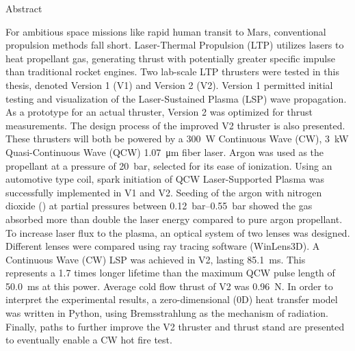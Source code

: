 \begin{plainchp}{Abstract}
    
    For ambitious space missions like rapid human transit to Mars, conventional propulsion methods fall short. Laser-Thermal Propulsion (LTP) utilizes lasers to heat propellant gas, generating thrust with potentially greater specific impulse than traditional rocket engines. Two lab-scale LTP thrusters were tested in this thesis, denoted Version 1 (V1) and Version 2 (V2). Version 1 permitted initial testing and visualization of the Laser-Sustained Plasma (LSP) wave propagation. As a prototype for an actual thruster, Version 2 was optimized for thrust measurements. The design process of the improved V2 thruster is also presented. These thrusters will both be powered by a \qty{300}{W} Continuous Wave (CW), \qty{3}{kW} Quasi-Continuous Wave (QCW) \qty{1.07}{μm} fiber laser. Argon was used as the propellant at a pressure of \qty{20}{bar}, selected for its ease of ionization. Using an automotive type coil, spark initiation of QCW Laser-Supported Plasma was successfully implemented in V1 and V2. Seeding of the argon with nitrogen dioxide () at partial pressures between \qtyrange{.12}{.55}{bar} showed the gas absorbed more than double the laser energy compared to pure argon propellant. To increase laser flux to the plasma, an optical system of two lenses was designed. Different lenses were compared using ray tracing software (WinLens3D). A Continuous Wave (CW) LSP was achieved in V2, lasting \qty{85.1}{ms}. This represents a 1.7 times longer lifetime than the maximum QCW pulse length of \qty{50.0}{ms} at this power. Average cold flow thrust of V2 was \qty{0.96}{N}. In order to interpret the experimental results, a zero-dimensional (0D) heat transfer model was written in Python, using Bremsstrahlung as the mechanism of radiation. Finally, paths to further improve the V2 thruster and thrust stand are presented to eventually enable a CW hot fire test.

\end{plainchp}